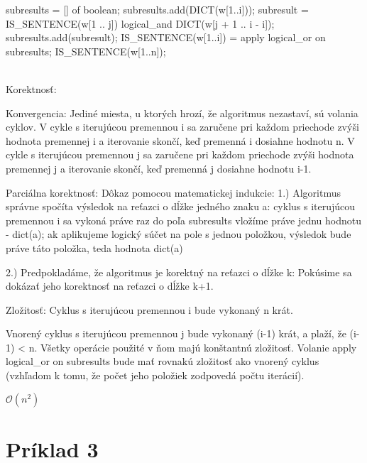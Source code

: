 \documentclass[paper=a4, fontsize=11pt]{scrartcl} %
\numberwithin{equation}{section} %
\numberwithin{figure}{section} %
\numberwithin{table}{section} %
\begin{document}
\begin{algorithmic}[1]
    		\State subresults = [] of boolean;
			\State subresults.add(DICT(w[1..i]));
					\State subresult = IS\_SENTENCE(w[1 .. j]) logical\_and DICT(w[j + 1 .. i - i]);
					\State subresults.add(subresult);
				\EndFor
			\State \Return IS\_SENTENCE(w[1..i]) = apply logical\_or on subresults;
		\EndFor
		\State \Return IS\_SENTENCE(w[1..n]);
    \EndFunction
	
\end{algorithmic}
\ \\
 
Korektnosť: 

Konvergencia:
Jediné miesta, u ktorých hrozí, že algoritmus nezastaví, sú volania cyklov.
V cykle s iterujúcou premennou i sa zaručene pri každom priechode zvýši hodnota premennej i a iterovanie skončí, keď premenná i dosiahne hodnotu n.
V cykle s iterujúcou premennou j sa zaručene pri každom priechode zvýši hodnota premennej j a iterovanie skončí, keď premenná j dosiahne hodnotu i-1.

Parciálna korektnosť:
Dôkaz pomocou matematickej indukcie:
1.) Algoritmus správne spočíta výsledok na reťazci o dĺžke jedného znaku a:
	cyklus s iterujúcou premennou i sa vykoná práve raz
	do poľa subresults vložíme práve jednu hodnotu - dict(a);
	ak aplikujeme logický súčet na pole s jednou položkou, výsledok bude práve táto položka, teda hodnota dict(a)
	
2.) Predpokladáme, že algoritmus je korektný na reťazci o dĺžke k:
	Pokúsime sa dokázať jeho korektnosť na reťazci o dĺžke k+1.



 
Zložitosť:
Cyklus s iterujúcou premennou i bude vykonaný n krát.

Vnorený cyklus s iterujúcou premennou j bude vykonaný (i-1) krát, a plaží, že (i-1) < n. Všetky operácie použité v ňom majú konštantnú zložitosť.
Volanie apply logical\_or on subresults bude mať rovnakú zložitosť ako vnorený cyklus (vzhľadom k tomu, že počet jeho položiek zodpovedá počtu iterácií).

$\mathcal{O}(n^2)$

\pagebreak


\section*{Príklad 3}
\end{document}
